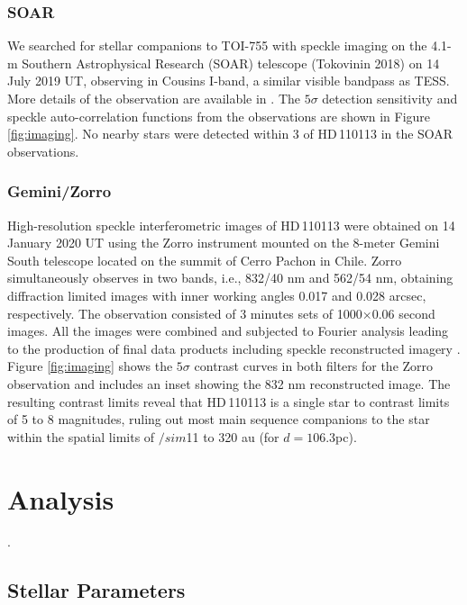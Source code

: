 \documentclass[fleqn,usenatbib]{mnras}
\newcommand{\Tstar}{HD\,110113}
\begin{document}
\subsubsection{SOAR}
We searched for stellar companions to TOI-755 with speckle imaging on the 4.1-m Southern Astrophysical Research (SOAR) telescope (Tokovinin 2018) on 14 July 2019 UT, observing in Cousins I-band, a similar visible bandpass as TESS. More details of the observation are available in \citet{ziegler2020vizier}. The $5\sigma$ detection sensitivity and speckle auto-correlation functions from the observations are shown in Figure \ref{fig:imaging}. No nearby stars were detected within 3\arcsec{} of \Tstar{} in the SOAR observations.

\subsubsection{Gemini/Zorro}
High-resolution speckle interferometric images of \Tstar{} were obtained on 14 January 2020 UT using the Zorro  instrument mounted on the 8-meter Gemini South telescope located on the summit of Cerro Pachon in Chile. 
Zorro simultaneously observes in two bands, i.e., 832/40 nm and 562/54 nm, obtaining diffraction limited images with inner working angles 0.017 and 0.028 arcsec, respectively. The observation consisted of 3 minutes sets of 1000×0.06 second images. All the images were combined and subjected to Fourier analysis leading to the production of final data products including speckle reconstructed imagery \citep[see][]{2011AJ....142...19H}.
Figure \ref{fig:imaging} shows the $5\sigma$ contrast curves in both filters for the Zorro observation and includes an inset showing the 832 nm reconstructed image.
The resulting contrast limits reveal that \Tstar{} is a single star to contrast limits of 5 to 8 magnitudes, ruling out most main sequence companions to the star within the spatial limits of $/sim$11 to 320 au (for $d=106.3$pc).

\section{Analysis}\label{sect:analysis}.
\subsection{Stellar Parameters}
\end{document}
